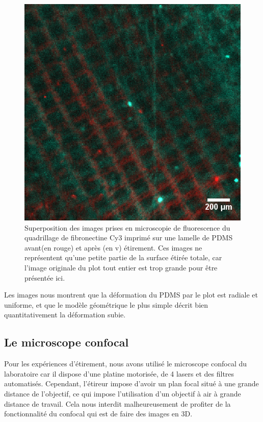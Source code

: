 \begin{figure}
\includegraphics[scale=0.3]{Figures/Zoom_Calibration_etireur.png} 

\caption{Superposition des images prises en microscopie de fluorescence du quadrillage de fibronectine Cy3 imprimé sur une lamelle de PDMS avant(en rouge) et après (en v) étirement. Ces images ne représentent qu'une petite partie de la surface étirée totale, car l'image originale du plot tout entier est trop grande pour être présentée ici.}
\end{figure}
	Les images nous montrent que la déformation du PDMS par le plot est radiale et uniforme, et que le modèle géométrique le plus simple décrit bien quantitativement la déformation subie. 
	
	\subsection{Le microscope confocal}
	
	Pour les expériences d'étirement, nous avons utilisé le microscope confocal du laboratoire car il dispose d'une platine motorisée, de 4 lasers et des filtres automatisés. Cependant, l'étireur impose d'avoir un plan focal situé à une grande distance de l'objectif, ce qui impose l'utilisation d'un objectif à air à grande distance de travail. Cela nous interdit malheureusement de profiter de la fonctionnalité du confocal qui est de faire des images en 3D. 
	
